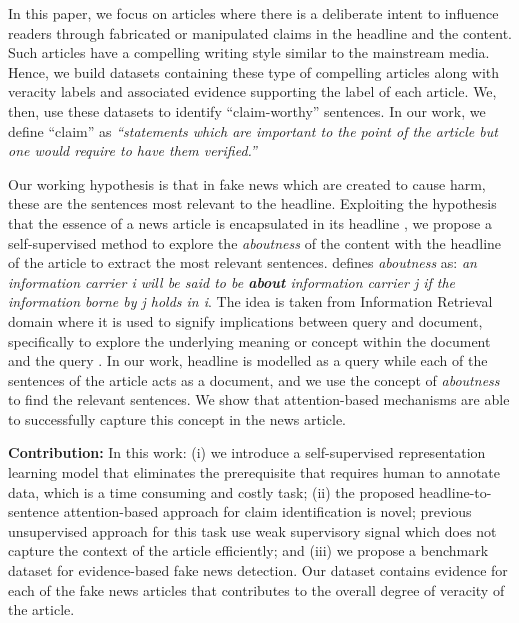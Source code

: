 \documentclass[11pt,a4paper]{article}
\begin{document}
{
In this paper, we focus on articles where there is a deliberate intent to influence readers through fabricated or manipulated claims in the headline and the content. Such articles have a compelling writing style similar to the mainstream media. Hence, we build datasets containing these type of compelling articles along with veracity labels and associated evidence supporting the label of each article. We, then, use these datasets to identify ``claim-worthy'' sentences. In our work, we define ``claim'' as \textit{``statements which are important to the point of the article but one would require to have them verified.''}} 

{Our working hypothesis is that in fake news which are created to cause harm, these are the sentences most relevant to the headline. Exploiting the hypothesis that the essence of a news article is encapsulated in its headline \citep{article, Kuiken, Wahl-Jorgensen}, we propose a self-supervised method to explore the \textit{aboutness} of the content with the headline of the article to extract the most relevant sentences. \citet{bruza1996study} defines \textit{aboutness} as: \textit{an information carrier i will be said to be \textbf{about} information carrier j if the information borne by j holds in i}. The idea is taken from Information Retrieval domain where it is used to signify implications between query and document, specifically to explore the underlying meaning or concept within the document and the query \cite{azzopardi2009advances}. In our work, headline is modelled as a query while each of the sentences of the article acts as a document, and we use the concept of \textit{aboutness} to find the relevant sentences. We show that attention-based mechanisms are able to successfully capture this concept in the news article.}


{
}

{
\textbf{Contribution:}  
In this work: (i) we introduce a self-supervised representation learning model that eliminates the prerequisite that requires human to annotate data, which is a time consuming and costly task; (ii) the proposed headline-to-sentence attention-based approach for claim identification is novel; previous unsupervised approach for this task use weak supervisory signal which does not capture the context of the article efficiently; and (iii) we propose a benchmark dataset for evidence-based fake news detection. Our dataset contains evidence for each of the fake news articles that contributes to the overall degree of veracity of the article.
}
\end{document}
